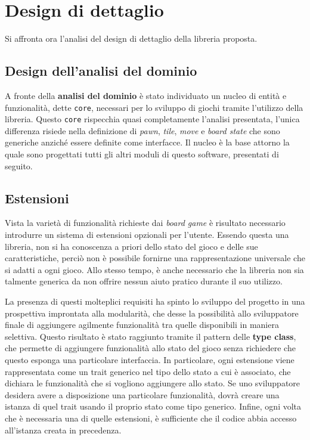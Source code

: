 \section{Design di dettaglio}



Si affronta ora l'analisi del design di dettaglio della libreria proposta.

\subsection{Design dell'analisi del dominio}
A fronte della \textbf{analisi del dominio} è stato individuato un nucleo di entità e funzionalità, dette \texttt{core}, necessari per lo sviluppo di giochi tramite l'utilizzo della libreria.
%
Questo \texttt{core} rispecchia quasi completamente l'analisi presentata, l'unica differenza risiede nella definizione di \textit{pawn}, \textit{tile}, \textit{move} e \textit{board state} che sono generiche anziché essere definite come interfacce.
%
Il nucleo è la base attorno la quale sono progettati tutti gli altri moduli di questo software, presentati di seguito.

\subsection{Estensioni}

Vista la varietà di funzionalità richieste dai \textit{board game} è risultato necessario introdurre un sistema di estensioni opzionali per l'utente.
%
Essendo questa una libreria, non si ha conoscenza a priori dello stato del gioco e delle sue caratteristiche, perciò non è possibile fornirne una rappresentazione universale che si adatti a ogni gioco.
%
Allo stesso tempo, è anche necessario che la libreria non sia talmente generica da non offrire nessun aiuto pratico durante il suo utilizzo.

La presenza di questi molteplici requisiti ha spinto lo sviluppo del progetto in una prospettiva improntata alla modularità, che desse la possibilità allo sviluppatore finale di aggiungere agilmente funzionalità tra quelle disponibili in maniera selettiva.
%
Questo risultato è stato raggiunto tramite il pattern delle \textbf{type class}, che permette di aggiungere funzionalità allo stato del gioco senza richiedere che questo esponga una particolare interfaccia.
%
In particolare, ogni estensione viene rappresentata come un trait generico nel tipo dello stato a cui è associato, che dichiara le funzionalità che si vogliono aggiungere allo stato.
%
Se uno sviluppatore desidera avere a disposizione una particolare funzionalità, dovrà creare una istanza di quel trait usando il proprio stato come tipo generico.
%
Infine, ogni volta che è necessaria una di quelle estensioni, è sufficiente che il codice abbia accesso all'istanza creata in precedenza.

